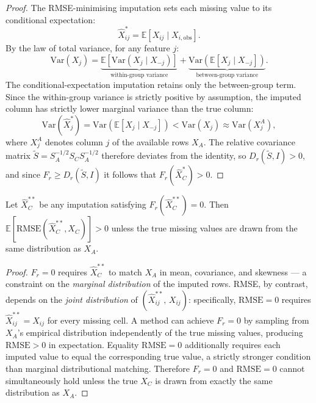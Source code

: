 \begin{proof}
The RMSE-minimising imputation sets each missing value to its conditional expectation:
\[
  \hat{X}_{ij}^{*} = \mathbb{E}[X_{ij} \mid X_{i,\mathrm{obs}}].
\]
By the law of total variance, for any feature $j$:
\[
  \mathrm{Var}(X_j)
  = \underbrace{\mathbb{E}[\mathrm{Var}(X_j \mid X_{-j})]}_{\text{within-group variance}}
  + \underbrace{\mathrm{Var}(\mathbb{E}[X_j \mid X_{-j}])}_{\text{between-group variance}}.
\]
The conditional-expectation imputation retains only the between-group term.
Since the within-group variance is strictly positive by assumption, the imputed column has strictly lower marginal variance than the true column:
\[
  \mathrm{Var}(\hat{X}_j^{*}) = \mathrm{Var}(\mathbb{E}[X_j \mid X_{-j}])
  < \mathrm{Var}(X_j) \approx \mathrm{Var}(X_j^A),
\]
where $X_j^A$ denotes column $j$ of the available rows $X_A$.
The relative covariance matrix $\tilde{S} = S_A^{-1/2} S_C S_A^{-1/2}$ therefore deviates from the identity, so $D_r(\tilde{S}, I) > 0$, and since $F_r \geq D_r(\tilde{S}, I)$ it follows that $F_r(\hat{X}_C^{*}) > 0$.
\end{proof}

\begin{proposition}
\label{prop:fr_implies_rmse}
Let $\hat{X}_C^{**}$ be any imputation satisfying $F_r(\hat{X}_C^{**}) = 0$.
Then $\mathbb{E}[\mathrm{RMSE}(\hat{X}_C^{**}, X_C)] > 0$ unless the true missing values are drawn from the same distribution as $X_A$.
\end{proposition}

\begin{proof}
$F_r = 0$ requires $\hat{X}_C^{**}$ to match $X_A$ in mean, covariance, and skewness --- a constraint on the \emph{marginal distribution} of the imputed rows.
RMSE, by contrast, depends on the \emph{joint distribution} of $(\hat{X}_{ij}^{**},\, X_{ij})$: specifically, $\mathrm{RMSE} = 0$ requires $\hat{X}_{ij}^{**} = X_{ij}$ for every missing cell.
A method can achieve $F_r = 0$ by sampling from $X_A$'s empirical distribution independently of the true missing values, producing $\mathrm{RMSE} > 0$ in expectation.
Equality $\mathrm{RMSE} = 0$ additionally requires each imputed value to equal the corresponding true value, a strictly stronger condition than marginal distributional matching.
Therefore $F_r = 0$ and $\mathrm{RMSE} = 0$ cannot simultaneously hold unless the true $X_C$ is drawn from exactly the same distribution as $X_A$.
\end{proof}

